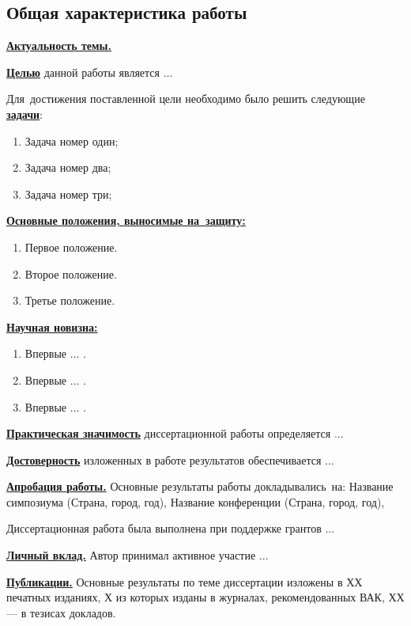 \subsection*{\Large Общая характеристика работы}
\underline{\textbf{Актуальность темы.}}

\underline{\textbf{Целью}} данной работы является ...

Для~достижения поставленной цели необходимо было решить следующие \underline{\textbf{задачи}}:
\begin{enumerate}
 \item Задача номер один;
 \item Задача номер два;
 \item Задача номер три;
\end{enumerate}

\underline{\textbf{Основные положения, выносимые на~защиту:}}
\begin{enumerate}
 \item Первое положение.
 \item Второе положение.
 \item Третье положение.
\end{enumerate}

\underline{\textbf{Научная новизна:}}
\begin{enumerate}
 \item Впервые ... . 
 \item Впервые ... .
 \item Впервые ... . 
\end{enumerate}

\underline{\textbf{Практическая значимость}} диссертационной работы определяется ...

\underline{\textbf{Достоверность}} изложенных в работе результатов обеспечивается ...

\underline{\textbf{Апробация работы.}}
Основные результаты работы докладывались~на:
Название симпозиума (Страна, город, год),
Название конференции (Страна, город, год),

Диссертационная работа была выполнена при поддержке грантов ...

\underline{\textbf{Личный вклад.}} Автор принимал активное участие ...

\underline{\textbf{Публикации.}} Основные результаты по теме диссертации изложены в ХХ печатных изданиях, Х из которых изданы в журналах, рекомендованных ВАК, ХХ --- в тезисах докладов.

